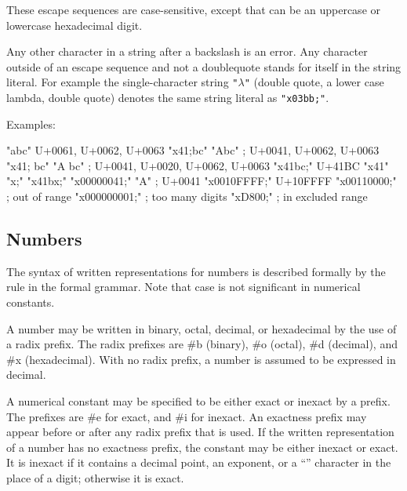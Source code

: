 These escape sequences are case-sensitive, except that  can be an uppercase or lowercase hexadecimal digit.

Any other character in a string after a backslash is an error. Any
character outside of an escape sequence and not a doublequote stands
for itself in the string literal. For example the single-character
string {\tt "$\lambda$"} (double quote, a lower case lambda, double
quote) denotes the same string literal as {\tt "\backwhack{}x03bb;"}.

Examples:

\begin{schemenoindent}
"abc" \ev  \textrm{U+0061, U+0062, U+0063}
"\backwhack{}x41;bc" \ev  "Abc" ; \textrm{U+0041, U+0062, U+0063}
"\backwhack{}x41; bc" \ev "A bc"
\>\>; \textrm{U+0041, U+0020, U+0062, U+0063}
"\backwhack{}x41bc;" \ev  \textrm{U+41BC}
"\backwhack{}x41" \ev {}
"\backwhack{}x;" \ev {}
"\backwhack{}x41bx;" \ev {}
"\backwhack{}x00000041;" \ev  "A" ; \textrm{U+0041}
"\backwhack{}x0010FFFF;" \ev \textrm{U+10FFFF}
"\backwhack{}x00110000;" \ev  {}
\>\>; \textrm{out of range}
"\backwhack{}x000000001;" \ev {}
\>\>; \textrm{too many digits}
"\backwhack{}xD800;" \ev {}
\>\>; \textrm{in excluded range}
\end{schemenoindent}
  
\subsection{Numbers}
\label{numbernotations}

The syntax of written representations for numbers is described
formally by the  rule in the formal grammar.  Note that
case is not significant in numerical constants.

A number may be written in binary, octal, decimal, or
hexadecimal by the use of a radix prefix.  The radix prefixes are {\cf
\#b} (binary), {\cf \#o} (octal), {\cf
\#d} (decimal), and {\cf \#x} (hexadecimal).  With
no radix prefix, a number is assumed to be expressed in decimal.

A
numerical constant may be specified to be either exact or
inexact by a prefix.  The prefixes are {\cf \#e}
for exact, and {\cf \#i} for inexact.  An exactness
prefix may appear before or after any radix prefix that is used.  If
the written representation of a number has no exactness prefix, the
constant may be either inexact or exact.  It is
inexact if it contains a decimal point, an
exponent, or a ``\sharpsign'' character in the place of a digit;
otherwise it is exact.

